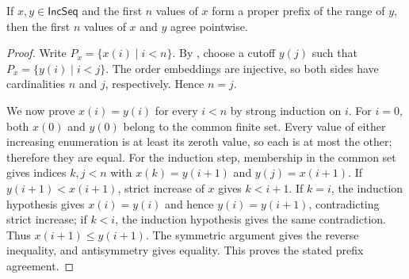 \begin{helper}
If $x,y\in\mathsf{IncSeq}$ and the first $n$ values of $x$ form a proper
prefix of the range of $y$, then the first $n$ values of $x$ and $y$ agree
pointwise.
\end{helper}
\begin{proof}
Write $P_x=\{x(i)\mid i<n\}$.  By
, choose a cutoff $y(j)$ such that
$P_x=\{y(i)\mid i<j\}$.  The order embeddings are injective, so both sides
have cardinalities $n$ and $j$, respectively.  Hence $n=j$.

We now prove $x(i)=y(i)$ for every $i<n$ by strong induction on $i$.  For
$i=0$, both $x(0)$ and $y(0)$ belong to the common finite set.  Every value
of either increasing enumeration is at least its zeroth value, so each is
at most the other; therefore they are equal.  For the induction step,
membership in the common set gives indices $k,j<n$ with
$x(k)=y(i+1)$ and $y(j)=x(i+1)$.  If $y(i+1)<x(i+1)$, strict increase of
$x$ gives $k<i+1$.  If $k=i$, the induction hypothesis gives
$x(i)=y(i)$ and hence $y(i)=y(i+1)$, contradicting strict increase; if
$k<i$, the induction hypothesis gives the same contradiction.  Thus
$x(i+1)\le y(i+1)$.  The symmetric argument gives the reverse inequality,
and antisymmetry gives equality.  This proves the stated prefix agreement.
\end{proof}
